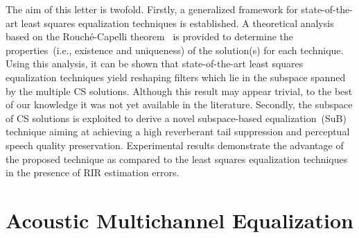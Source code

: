 \documentclass[11pt,draftcls,onecolumn]{IEEEtran}
\begin{document}
The aim of this letter is twofold.
Firstly, a generalized framework for state-of-the-art least squares equalization techniques is established. 
A theoretical analysis based on the Rouch\'{e}-Capelli theorem~\cite{shafarevic_algebra_book} is provided to determine the properties~(i.e., existence and uniqueness) of the solution(s) for each technique.
Using this analysis, it can be shown that state-of-the-art least squares equalization techniques yield reshaping filters which lie in the subspace spanned by the multiple CS solutions.
Although this result may appear trivial, to the best of our knowledge it was not yet available in the literature.
Secondly, the subspace of CS solutions is exploited to derive a novel subspace-based equalization~(SuB) technique aiming at achieving a high reverberant tail suppression and perceptual speech quality preservation. 
Experimental results demonstrate the advantage of the proposed technique as compared to the least squares equalization techniques in the presence of RIR estimation errors.

\section{Acoustic Multichannel Equalization}
\end{document}
